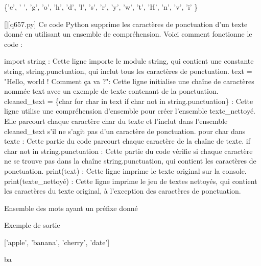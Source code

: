 \{'e', ' ', 'g', 'o', 'h', 'd', 'l', 's', 'r', 'y', 'w', 't', 'H', 'n', 'v', 'i' \}
        \par
        \begin{solution}
            \renewcommand{\nomfichier}{q657.py}
            \pythonfile{\chemincode \nomfichier}[][\nomfichier]
            Ce code Python supprime les caractères de ponctuation d'un texte donné en utilisant un ensemble de compréhension. Voici comment fonctionne le code :

    import string : Cette ligne importe le module string, qui contient une constante string, string.punctuation, qui inclut tous les caractères de ponctuation.
    text = "Hello, world ! Comment ça va ?": Cette ligne initialise une chaîne de caractères nommée text avec un exemple de texte contenant de la ponctuation.
    cleaned\_text = \{char for char in text if char not in string.punctuation\} : Cette ligne utilise une compréhension d'ensemble pour créer l'ensemble texte\_nettoyé. Elle parcourt chaque caractère char du texte et l'inclut dans l'ensemble cleaned\_text s'il ne s'agit pas d'un caractère de ponctuation.
        pour char dans texte : Cette partie du code parcourt chaque caractère de la chaîne de texte.
        if char not in string.punctuation : Cette partie du code vérifie si chaque caractère ne se trouve pas dans la chaîne string.punctuation, qui contient les caractères de ponctuation.
    print(text) : Cette ligne imprime le texte original sur la console.
    print(texte\_nettoyé) : Cette ligne imprime le jeu de textes nettoyés, qui contient les caractères du texte original, à l'exception des caractères de ponctuation.
        \end{solution}
        

        \question
        Ensemble des mots ayant un préfixe donné

Exemple de sortie

['apple', 'banana', 'cherry', 'date']

ba

